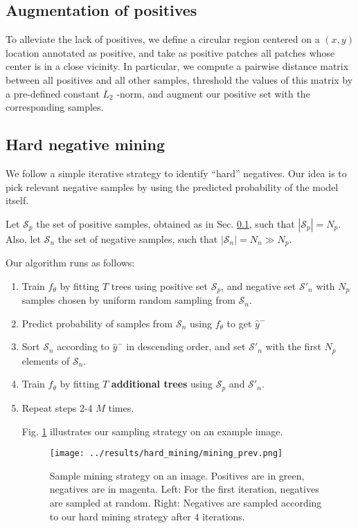 \documentclass[11pt]{article}
\begin{document}
\subsection{Augmentation of positives}
\label{sec:orgf6647b5}

To alleviate the lack of positives, we define a circular region centered on a \((x,y)\) location
annotated as positive, and
take as positive patches all patches whose center is in a close vicinity.
In particular, we compute a pairwise distance matrix between all positives and all other samples,
threshold the values of this matrix by a pre-defined constant \(L_2\) -norm,
and augment our positive set with the corresponding samples.

\subsection{Hard negative mining}
\label{sec:org6b3f574}

We follow a simple iterative strategy to identify ``hard'' negatives.
Our idea is to pick relevant negative samples by using the predicted probability of the model itself.

Let \(\mathcal{S}_p\) the set of positive samples, obtained as in Sec. \ref{sec:orgf6647b5}, such that \(|\mathcal{S}_p|=N_p\).
Also, let \(\mathcal{S}_n\) the set of negative samples, such that \(|\mathcal{S}_n|=N_n \gg N_p\).

Our algorithm runs as follows:

\begin{enumerate}
\item Train \(f_\theta\) by fitting \(T\) trees using positive set \(\mathcal{S}_p\), and negative set \(\mathcal{S}'_n\) with \(N_p\)
samples chosen by uniform random sampling from \(\mathcal{S}_n\).
\item Predict probability of samples from \(\mathcal{S}_n\) using \(f_\theta\) to get \(\hat{y}^-\)
\item Sort \(\mathcal{S}_n\) according to \(\hat{y}^-\) in descending order, and set
\(\mathcal{S}'_n\) with the first \(N_p\) elements of \(\mathcal{S}_n\).
\item Train \(f_\theta\) by fitting \(T\) \textbf{additional trees} using \(\mathcal{S}_p\) and \(\mathcal{S}'_n\).
\item Repeat steps 2-4 \(M\) times.

Fig. \ref{fig:org08d1214} illustrates our sampling strategy on an example image.

\begin{figure}[htbp]
\centering
\texttt{[image: ../results/hard\_mining/mining\_prev.png]}
\caption{\label{fig:org08d1214}Sample mining strategy on an image. Positives are in green, negatives are in magenta. Left: For the first iteration, negatives are sampled at random. Right: Negatives are sampled according to our hard mining strategy after \(4\) iterations.}
\end{figure}
\end{enumerate}
\end{document}

